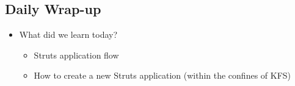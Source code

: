 \documentclass[12pt,notitlepage]{article}
\begin{document}
    \W \begin{s5slide}
        \W \section{Daily Wrap-up}
        \begin{ifhtml}
            \begin{itemize}
                \item What did we learn today?
                \begin{itemize}
                    \item Struts application flow
                    \item How to create a new Struts application (within the confines of KFS)
                \end{itemize}
            \end{itemize}
        \end{ifhtml} 
    \W \end{s5slide}
\end{document}
